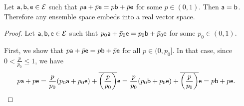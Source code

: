 \begin{thrm}
	Let $\ens[a], \ens[b], \ens \in \Ens$ such that $p\ens[a] + \bar{p} \ens = p \ens[b] + \bar{p} \ens$ for some $p \in (0,1)$. Then $\ens[a] = \ens[b]$. Therefore any ensemble space embeds into a real vector space.
\end{thrm}


\begin{proof}
	Let $\ens[a], \ens[b], \ens \in \Ens$ such that $p_0\ens[a] + \bar{p}_0 \ens = p_0 \ens[b] + \bar{p}_0 \ens$ for some $p_0 \in (0,1)$.
	
	First, we show that $p\ens[a] + \bar{p} \ens = p \ens[b] + \bar{p} \ens$ for all $p \in (0,p_0]$. In that case, since $0 < \frac{p}{p_0} \leq 1$, we have
	\begin{equation}
		\begin{aligned}
			p \ens[a] + \bar{p} \ens &= \frac{p}{p_0} (p_0 \ens[a] + \bar{p}_0 \ens) + \overline{\left(\frac{p}{p_0}\right)} \ens = \frac{p}{p_0} (p_0 \ens[b] + \bar{p}_0 \ens) + \overline{\left(\frac{p}{p_0}\right)} \ens = p \ens[b] + \bar{p} \ens.
		\end{aligned}
	\end{equation}
	

\end{proof}
